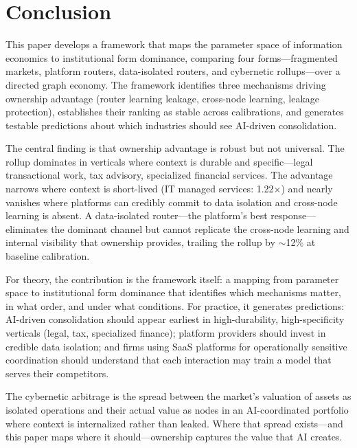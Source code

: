 \documentclass[12pt]{article}
\theoremstyle{definition}
\begin{document}
\section{Conclusion}

This paper develops a framework that maps the parameter space of information economics to institutional form dominance, comparing four forms---fragmented markets, platform routers, data-isolated routers, and cybernetic rollups---over a directed graph economy. The framework identifies three mechanisms driving ownership advantage (router learning leakage, cross-node learning, leakage protection), establishes their ranking as stable across calibrations, and generates testable predictions about which industries should see AI-driven consolidation.

The central finding is that ownership advantage is robust but not universal. The rollup dominates in verticals where context is durable and specific---legal transactional work, tax advisory, specialized financial services. The advantage narrows where context is short-lived (IT managed services: 1.22$\times$) and nearly vanishes where platforms can credibly commit to data isolation and cross-node learning is absent. A data-isolated router---the platform's best response---eliminates the dominant channel but cannot replicate the cross-node learning and internal visibility that ownership provides, trailing the rollup by $\sim$12\% at baseline calibration.

For theory, the contribution is the framework itself: a mapping from parameter space to institutional form dominance that identifies which mechanisms matter, in what order, and under what conditions. For practice, it generates predictions: AI-driven consolidation should appear earliest in high-durability, high-specificity verticals (legal, tax, specialized finance); platform providers should invest in credible data isolation; and firms using SaaS platforms for operationally sensitive coordination should understand that each interaction may train a model that serves their competitors.

The cybernetic arbitrage is the spread between the market's valuation of assets as isolated operations and their actual value as nodes in an AI-coordinated portfolio where context is internalized rather than leaked. Where that spread exists---and this paper maps where it should---ownership captures the value that AI creates.

\end{document}
